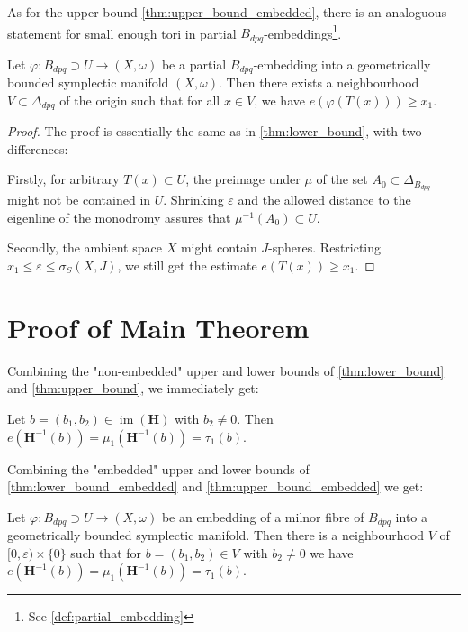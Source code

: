 \documentclass[12pt,a4paper,draft]{scrartcl}
\DeclareMathOperator{\im}{im}
\begin{document}
As for the upper bound \cref{thm:upper_bound_embedded}, there is an analoguous statement for small enough tori in partial $B_{dpq}$-embeddings\footnote{See \cref{def:partial_embedding}}.

\begin{proposition}
  \label{thm:embedded_lower_bound}
    Let $φ:B_{dpq} ⊃ U → (X,ω)$ be a partial $B_{dpq}$-embedding into a geometrically bounded symplectic manifold $(X,\omega)$. Then there exists a neighbourhood $V \subset \Delta_{dpq}$ of the origin such that for all $x \in V$, we have $e(φ(T(x))) \geq x_1$.
\end{proposition}

\begin{proof}


  The proof is essentially the same as in \cref{thm:lower_bound}, with two differences:

  Firstly, for arbitrary $T(x) ⊂ U$, the preimage under $μ$ of the set $A_0 ⊂ Δ_{B_{dpq}}$ might not be contained in $U$.
  Shrinking $ε$ and the allowed distance to the eigenline of the monodromy assures that $μ^{-1}(A_0) ⊂ U$.

  Secondly, the ambient space $X$ might contain $J$-spheres.
Restricting $x_1 ≤ ε ≤ σ_S(X,J)$, we still get the estimate $e(T(x)) ≥ x_1$.

\end{proof}




\section{Proof of Main Theorem}
\label{sec:main_thm}

Combining the "non-embedded" upper and lower bounds of \cref{thm:lower_bound} and \cref{thm:upper_bound}, we immediately get:

\begin{theorem}
  \label{thm:displacement_energy}
  Let $b=(b_1,b_2) ∈ \im(\symbf{H})$ with $b_2 ≠ 0$. Then $e(\symbf{H}^{-1}(b)) = μ_1(\symbf{H}^{-1}(b)) = τ_1(b)$.
\end{theorem}

Combining the "embedded" upper and lower bounds of \cref{thm:lower_bound_embedded} and \cref{thm:upper_bound_embedded} we get:

\begin{theorem}
  \label{thm:displacement_energy_embedded}
  Let $φ \colon B_{dpq} ⊃ U → (X,ω)$ be an embedding of a milnor fibre of $B_{dpq}$ into a geometrically bounded symplectic manifold.
Then there is a neighbourhood $V$ of $[0,ε) × \{0\}$ such that for $b = (b_1,b_2) ∈ V$ with $b_2 ≠ 0$ we have $e(\symbf{H}^{-1}(b)) = μ_1(\symbf{H}^{-1}(b)) = τ_1(b)$.
\end{theorem}
\end{document}
